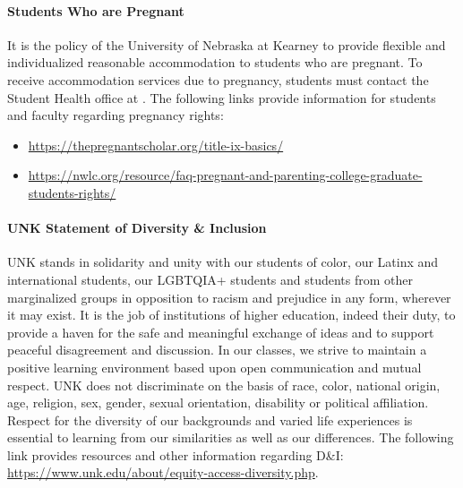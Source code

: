 \documentclass[12pt]{article}
\newcounter{ex}\setcounter{ex}{0}
\begin{document}
\paragraph{Students Who are Pregnant} It is the policy of the University of Nebraska at Kearney to provide flexible and 
individualized reasonable accommodation to students who are pregnant. To receive 
accommodation services due to pregnancy, students must contact the 
Student Health office at . The following links provide information 
for students and faculty regarding pregnancy rights: 

\begin{itemize}
\setlength\itemsep{-0.25em}
\item \url{https://thepregnantscholar.org/title-ix-basics/} 

\item \url{https://nwlc.org/resource/faq-pregnant-and-parenting-college-graduate-students-rights/}

\end{itemize}

\paragraph{UNK Statement of Diversity \& Inclusion}

UNK stands in solidarity and unity with our students of color, our Latinx 
and international students, our LGBTQIA+ students and students from other 
marginalized groups in opposition to racism and prejudice in any form, 
wherever it may exist. It is the job of institutions of higher education, 
indeed their duty, to provide a haven for the safe and meaningful exchange of 
ideas and to support peaceful disagreement and discussion. In our classes, 
we strive to maintain a positive learning environment based upon open 
communication and mutual respect. UNK does not discriminate on the basis of 
race, color, national origin, age, religion, sex, gender, sexual orientation, 
disability or political affiliation. Respect for the diversity of our backgrounds 
and varied life experiences is essential to learning from our similarities as 
well as our differences. The following link provides resources and other 
information regarding D\&I: \url{https://www.unk.edu/about/equity-access-diversity.php}.
\end{document}
